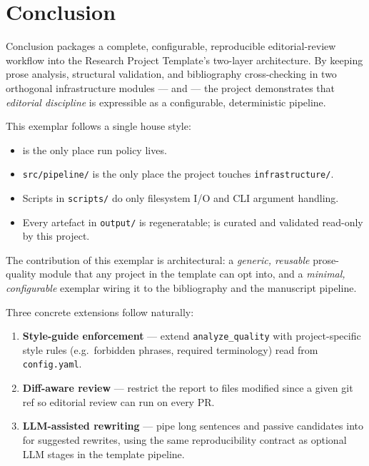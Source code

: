 \documentclass[
  ignorenonframetext,
]{beamer}
\author{\texorpdfstring{}{}}
\date{}
\providecommand{\tightlist}{%
  \setlength{\itemsep}{0pt}\setlength{\parskip}{0pt}}
\begin{document}
\section{Conclusion}\label{sec:conclusion}

\begin{frame}{Conclusion}
 packages a complete, configurable,
reproducible editorial-review workflow into the Research Project
Template's two-layer architecture. By keeping prose analysis, structural
validation, and bibliography cross-checking in two orthogonal
infrastructure modules ---  and
 --- the project demonstrates that
\emph{editorial discipline} is expressible as a configurable,
deterministic pipeline.

This exemplar follows a single house style:

\begin{itemize}
\tightlist
\item
   is the only place run policy lives.
\item
  \texttt{src/pipeline/} is the only place the project touches
  \texttt{infrastructure/}.
\item
  Scripts in \texttt{scripts/} do only filesystem I/O and CLI argument
  handling.
\item
  Every artefact in \texttt{output/} is regeneratable;
   is curated and validated read-only
  by this project.
\end{itemize}

The contribution of this exemplar is architectural: a \emph{generic,
reusable} prose-quality module that any project in the template can opt
into, and a \emph{minimal, configurable} exemplar wiring it to the
bibliography and the manuscript pipeline.

Three concrete extensions follow naturally:

\begin{enumerate}
\tightlist
\item
  \textbf{Style-guide enforcement} --- extend \texttt{analyze\_quality}
  with project-specific style rules (e.g.~forbidden phrases, required
  terminology) read from \texttt{config.yaml}.
\item
  \textbf{Diff-aware review} --- restrict the report to files modified
  since a given git ref so editorial review can run on every PR.
\item
  \textbf{LLM-assisted rewriting} --- pipe long sentences and passive
  candidates into  for suggested rewrites,
  using the same  reproducibility
  contract as optional LLM stages in the template pipeline.
\end{enumerate}
\end{frame}
\end{document}
